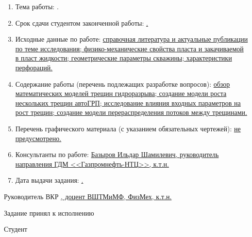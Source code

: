 \begin{enumerate}[1.]
	\item Тема работы: {\expandafter \ulined \thesisTitle.}
	\item Срок сдачи студентом законченной работы: \uline{\thesisDeadline.} 
	\item Исходные данные по работе: \uline{справочная литература и актуальные публикации по теме исследования; физико-механические свойства пласта и закачиваемой в пласт жидкости; геометрические параметры скважины; характеристики перфораций.}%
	\item Содержание работы (перечень подлежащих разработке вопросов): \uline{обзор математических моделей трещин гидроразрыва; создание модели роста нескольких трещин автоГРП; исследование влияния входных параметров на рост трещин; создание модели перераспределения потоков между трещинами.}
	\item Перечень графического материала (с указанием обязательных чертежей): \uline{не предусмотрено.}
		\item Консультанты по работе: \uline{Базыров Ильдар Шамилевич, руководитель направления ГДМ <<Газпромнефть-НТЦ>>, к.т.н.}
		\item Дата выдачи задания: \uline{\thesisStartDate.}
\end{enumerate}

\intervalS%

Руководитель ВКР \uline{\hspace*{0.09\textheight} \Supervisor, доцент ВШТМиМФ, ФизМех, к.т.н.}





\vspace{0.8\curtextsize}%


Задание принял к исполнению \uline{\thesisStartDate}

\vspace{0.7\curtextsize}%

Студент \uline{\hspace*{0.175\textheight} \Author}



